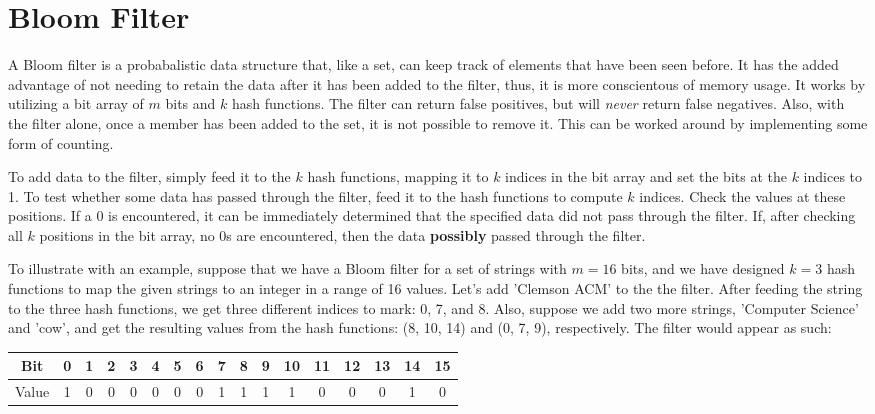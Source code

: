 \section{Bloom Filter}

A Bloom filter is a probabalistic data structure that, like a set, can keep track of elements that have been seen before.
It has the added advantage of not needing to retain the data after it has been added to the filter, thus, it is more conscientous of memory usage.
It works by utilizing a bit array of $m$ bits and $k$ hash functions.
The filter can return false positives, but will \textit{never} return false negatives.
Also, with the filter alone, once a member has been added to the set, it is not possible to remove it.
This can be worked around by implementing some form of counting.

To add data to the filter, simply feed it to the $k$ hash functions, mapping it to $k$ indices in the bit array and set the bits at the $k$ indices to 1.
To test whether some data has passed through the filter, feed it to the hash functions to compute $k$ indices.
Check the values at these positions.
If a 0 is encountered, it can be immediately determined that the specified data did not pass through the filter.
If, after checking all $k$ positions in the bit array, no 0s are encountered, then the data \textbf{possibly} passed through the filter.

To illustrate  with an example, suppose that we have a Bloom filter for a set of strings with $m = 16$ bits, and we have designed $k = 3$ hash functions to map the given strings to an integer in a range of 16 values.
Let's add 'Clemson ACM' to the the filter.
After feeding the string to the three hash functions, we get three different indices to mark: 0, 7, and 8.
Also, suppose we add two more strings, 'Computer Science' and 'cow', and get the resulting values from the hash functions: (8, 10, 14) and (0, 7, 9), respectively.
The filter would appear as such:

\begin{table}[h]
	\begin{center}
		\begin{tabular}{ | c | c | c | c | c | c | c | c | c | c | c | c | c | c | c | c | c | }
			\hline
			Bit		& 0 & 1 & 2 & 3 & 4 & 5 & 6 & 7 & 8 & 9 & 10 & 11 & 12 & 13 & 14 & 15 \\ \hline
			Value	& 1 & 0 & 0 & 0 & 0 & 0 & 0 & 1 & 1 & 1 & 1  & 0  & 0  & 0  & 1  & 0  \\ \hline
		\end{tabular}
	\end{center}
\end{table}

